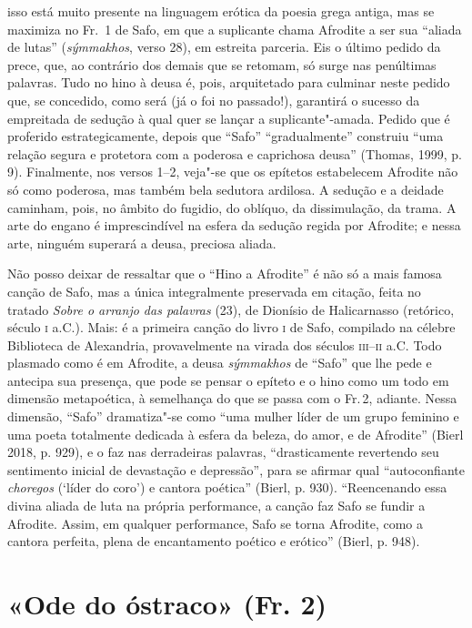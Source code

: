 {isso está muito presente na linguagem erótica da poesia grega antiga, mas se
maximiza no Fr.~1 de Safo, em que a suplicante chama Afrodite a ser sua
“aliada de lutas” (\textit{sýmmakhos}, verso 28), em estreita parceria. Eis o último pedido da prece, que, ao contrário dos demais que se retomam, só surge nas penúltimas palavras. Tudo no hino à deusa é, pois, arquitetado para culminar neste pedido que, se concedido, como será (já o foi no passado!), garantirá o sucesso da empreitada de sedução à qual quer se lançar a suplicante"-amada. Pedido que é proferido estrategicamente, depois que ``Safo'' ``gradualmente'' construiu ``uma relação segura e protetora com a poderosa e caprichosa deusa'' (Thomas, 1999, p.\,9). Finalmente, nos versos 1--2, veja"-se
que os epítetos estabelecem Afrodite não só como poderosa, mas também bela
sedutora ardilosa. A sedução e a deidade caminham, pois, no âmbito do fugidio,
do oblíquo, da dissimulação, da trama. A arte do engano é imprescindível na
esfera da sedução regida por Afrodite; e nessa arte, ninguém superará a deusa,
preciosa aliada.

Não posso deixar de ressaltar que o “Hino a Afrodite” é não só
a mais famosa canção de Safo, mas a única integralmente preservada em citação, feita no tratado \textit{Sobre o arranjo das palavras} (23), de Dionísio de Halicarnasso (retórico, século \textsc{i} a.C.). Mais: é a primeira canção do livro \textsc{i} de Safo,
compilado na célebre Biblioteca de Alexandria, provavelmente na virada dos
séculos \textsc{iii}--\textsc{ii} a.C.
Todo plasmado como é em Afrodite, a deusa \textit{sýmmakhos} de ``Safo'' que lhe pede e antecipa sua presença, que pode se pensar o epíteto e o hino como um todo em dimensão metapoética, à semelhança do que se passa com o Fr.\,2, adiante. Nessa dimensão, ``Safo'' dramatiza"-se como ``uma mulher líder de um grupo feminino e uma poeta totalmente dedicada à esfera da beleza, do amor, e de Afrodite'' (Bierl 2018, p. 929), e o faz nas derradeiras palavras, “drasticamente revertendo seu sentimento inicial de devastação e depressão”, para se afirmar qual “autoconfiante \textit{choregos} (‘líder do coro’) e cantora poética” (Bierl, p. 930). “Reencenando essa divina aliada de luta na própria performance, a canção faz Safo se fundir a Afrodite. Assim, em qualquer performance, Safo se torna Afrodite, como a cantora perfeita, plena de encantamento poético e erótico” (Bierl, p. 948).}

\pagebreak
\section{«Ode do óstraco» (Fr. 2)}

